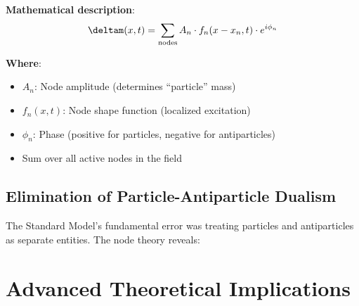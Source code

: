 	\textbf{Mathematical description}:
	\begin{equation}
		\deltam(x,t) = \sum_{\text{nodes}} A_n \cdot f_n(x-x_n, t) \cdot e^{i\phi_n}
	\end{equation}
	
	\textbf{Where}:
	\begin{itemize}
		\item $A_n$: Node amplitude (determines ``particle'' mass)
		\item $f_n(x,t)$: Node shape function (localized excitation)
		\item $\phi_n$: Phase (positive for particles, negative for antiparticles)
		\item Sum over all active nodes in the field
	\end{itemize}
	
	\subsection{Elimination of Particle-Antiparticle Dualism}
	
	The Standard Model's fundamental error was treating particles and antiparticles as separate entities. The node theory reveals:
	
	\begin{table}[htbp]
		\centering
		\caption{Elimination of particle-antiparticle dualism through node theory}
		\label{tab:node_theory_comparison}
	\end{table}
	
	\section{Advanced Theoretical Implications}
	
